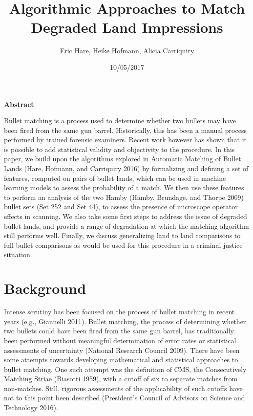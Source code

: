 \documentclass[12pt,]{article}
\title{Algorithmic Approaches to Match Degraded Land Impressions}
\author{Eric Hare, Heike Hofmann, Alicia Carriquiry}
\date{10/05/2017}
\theoremstyle{definition}
\theoremstyle{definition}
\theoremstyle{definition}
\theoremstyle{remark}
\begin{document}
\maketitle

\textbf{Abstract}

Bullet matching is a process used to determine whether two bullets may
have been fired from the same gun barrel. Historically, this has been a
manual process performed by trained forensic examiners. Recent work
however has shown that it is possible to add statistical validity and
objectivity to the procedure. In this paper, we build upon the
algorithms explored in Automatic Matching of Bullet Lands (Hare,
Hofmann, and Carriquiry 2016) by formalizing and defining a set of
features, computed on pairs of bullet lands, which can be used in
machine learning models to assess the probability of a match. We then
use these features to perform an analysis of the two Hamby (Hamby,
Brundage, and Thorpe 2009) bullet sets (Set 252 and Set 44), to assess
the presence of microscope operator effects in scanning. We also take
some first steps to address the issue of degraded bullet lands, and
provide a range of degradation at which the matching algorithm still
performs well. Finally, we discuss generalizing land to land comparisons
to full bullet comparisons as would be used for this procedure in a
criminal justice situation.

\section{Background}\label{background}

Intense scrutiny has been focused on the process of bullet matching in
recent years (e.g., Giannelli 2011). Bullet matching, the process of
determining whether two bullets could have been fired from the same gun
barrel, has traditionally been performed without meaningful
determination of error rates or statistical assessments of uncertainty
(National Research Council 2009). There have been some attempts towards
developing mathematical and statistical approaches to bullet matching.
One such attempt was the definition of CMS, the Consecutively Matching
Striae (Biasotti 1959), with a cutoff of six to separate matches from
non-matches. Still, rigorous assessments of the applicability of such
cutoffs have not to this point been described (President's Council of
Advisors on Science and Technology 2016).
\end{document}
